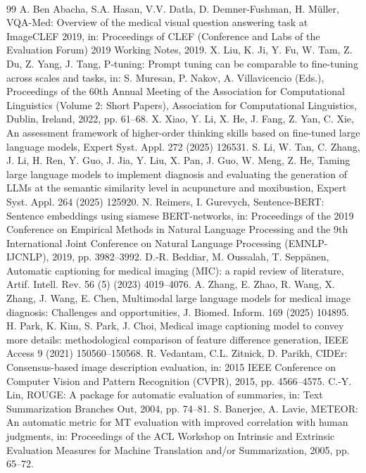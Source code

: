 ﻿﻿\documentclass[12pt]{report}
\begin{document}
\begin{thebibliography}{99}
 A. Ben Abacha, S.A. Hasan, V.V. Datla, D. Demner-Fushman, H. M\"uller, VQA-Med: Overview of the medical visual question answering task at ImageCLEF 2019, in: Proceedings of CLEF (Conference and Labs of the Evaluation Forum) 2019 Working Notes, 2019.
 X. Liu, K. Ji, Y. Fu, W. Tam, Z. Du, Z. Yang, J. Tang, P-tuning: Prompt tuning can be comparable to fine-tuning across scales and tasks, in: S. Muresan, P. Nakov, A. Villavicencio (Eds.), Proceedings of the 60th Annual Meeting of the Association for Computational Linguistics (Volume 2: Short Papers), Association for Computational Linguistics, Dublin, Ireland, 2022, pp. 61--68.
 X. Xiao, Y. Li, X. He, J. Fang, Z. Yan, C. Xie, An assessment framework of higher-order thinking skills based on fine-tuned large language models, Expert Syst. Appl. 272 (2025) 126531.
 S. Li, W. Tan, C. Zhang, J. Li, H. Ren, Y. Guo, J. Jia, Y. Liu, X. Pan, J. Guo, W. Meng, Z. He, Taming large language models to implement diagnosis and evaluating the generation of LLMs at the semantic similarity level in acupuncture and moxibustion, Expert Syst. Appl. 264 (2025) 125920.
 N. Reimers, I. Gurevych, Sentence-BERT: Sentence embeddings using siamese BERT-networks, in: Proceedings of the 2019 Conference on Empirical Methods in Natural Language Processing and the 9th International Joint Conference on Natural Language Processing (EMNLP-IJCNLP), 2019, pp. 3982--3992.
 D.-R. Beddiar, M. Oussalah, T. Sepp\"anen, Automatic captioning for medical imaging (MIC): a rapid review of literature, Artif. Intell. Rev. 56 (5) (2023) 4019--4076.
 A. Zhang, E. Zhao, R. Wang, X. Zhang, J. Wang, E. Chen, Multimodal large language models for medical image diagnosis: Challenges and opportunities, J. Biomed. Inform. 169 (2025) 104895.
 H. Park, K. Kim, S. Park, J. Choi, Medical image captioning model to convey more details: methodological comparison of feature difference generation, IEEE Access 9 (2021) 150560--150568.
 R. Vedantam, C.L. Zitnick, D. Parikh, CIDEr: Consensus-based image description evaluation, in: 2015 IEEE Conference on Computer Vision and Pattern Recognition (CVPR), 2015, pp. 4566--4575.
 C.-Y. Lin, ROUGE: A package for automatic evaluation of summaries, in: Text Summarization Branches Out, 2004, pp. 74--81.
 S. Banerjee, A. Lavie, METEOR: An automatic metric for MT evaluation with improved correlation with human judgments, in: Proceedings of the ACL Workshop on Intrinsic and Extrinsic Evaluation Measures for Machine Translation and/or Summarization, 2005, pp. 65--72.

\end{thebibliography}
\end{document}
